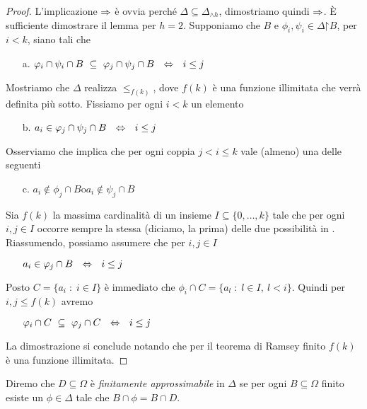 \begin{proof}
L'implicazione $\Rightarrow$ \`e ovvia perch\'e $\Delta\subseteq\Delta_{\wedge h}$, dimostriamo quindi $\Rightarrow$. \`E sufficiente dimostrare il lemma per $h=2$. Supponiamo che $B$ e $\phi_i, \psi_i\in\Delta\mathord\restriction B$, per $i<k$, siano tali che 

\begin{itemize}
\item[a.] $\phi_i\cap\psi_i\cap B\ \subseteq\ \phi_j\cap\psi_j\cap B\ \ \IFF\ \ i\le j$
\end{itemize}

Mostriamo che $\Delta$ realizza $\le_{f(k)}$, dove $f(k)$ \`e una funzione illimitata che verr\`a definita pi\`u sotto. Fissiamo per ogni $i<k$ un elemento 

\begin{itemize}
\item[b.] $a_i\in \varphi_j\cap\psi_j\cap B\ \ \Leftrightarrow\ \ i\le j$
\end{itemize}

Osserviamo che  implica che per ogni coppia $j<i\le k$ vale (almeno) una delle seguenti 

\begin{itemize}
\item[c.] $a_i\notin \phi_j\cap B$\qquad o\qquad $a_i\notin \psi_j\cap B$
\end{itemize}

Sia $f(k)$ la massima cardinalit\`a di un insieme $I\subseteq\big\{0,\dots,k\big\}$ tale che per ogni $i,j\in I$ occorre sempre la stessa (diciamo, la prima) delle due possibilit\`a in . Riassumendo, possiamo assumere che per $i,j\in I$

\begin{itemize}
\item[] $a_i\in \phi_j\cap B\ \ \IFF\ \ i\le j$ 
\end{itemize}

Posto $C=\{a_i\;:\;i\in I\}$ \`e immediato che $\phi_i\cap C = \{ a_l\;:\; l\in I,\ l<i\}$. Quindi per $i,j\le f(k)$  avremo
\begin{itemize}
\item[]$\phi_i\cap C\ \subseteq\ \phi_j\cap C\ \ \IFF\ \ i\le j$
\end{itemize}
La dimostrazione si conclude notando che per il teorema di Ramsey finito $f(k)$ \`e una funzione illimitata.
\end{proof}

Diremo che $D\subseteq \Omega$ \`e \emph{finitamente approssimabile\/} in $\Delta$ se per ogni $B\subseteq \Omega$ finito esiste un $\phi\in\Delta$ tale che $B\cap\phi=B\cap D$.

